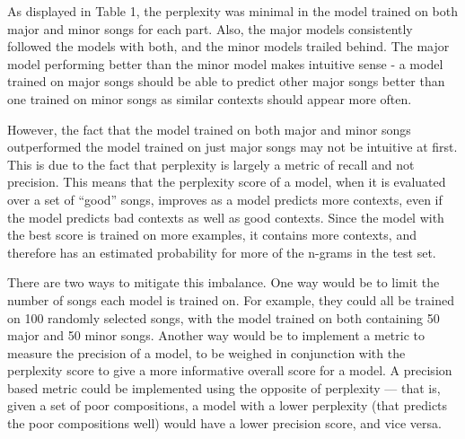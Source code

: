 \documentclass{sig-alternate}
\begin{document}
As displayed in Table 1, the perplexity was minimal in the model trained on both major and minor songs for each part. Also, the major models consistently followed the models with both, and the minor models trailed behind. The major model performing better than the minor model makes intuitive sense - a model trained on major songs should be able to predict other major songs better than one trained on minor songs as similar contexts should appear more often. 

However, the fact that the model trained on both major and minor songs outperformed the model trained on just major songs may not be intuitive at first. This is due to the fact that perplexity is largely a metric of recall and not precision. This means that the perplexity score of a model, when it is evaluated over a set of ``good'' songs, improves as a model predicts more contexts, even if the model predicts bad contexts as well as good contexts. Since the model with the best score is trained on more examples, it contains more contexts, and therefore has an estimated probability for more of the n-grams in the test set.

There are two ways to mitigate this imbalance. One way would be to limit the number of songs each model is trained on. For example, they could all be trained on 100 randomly selected songs, with the model trained on both containing 50 major and 50 minor songs. Another way would be to implement a metric to measure the precision of a model, to be weighed in conjunction with the perplexity score to give a more informative overall score for a model. A precision based metric could be implemented using the opposite of perplexity --- that is, given a set of poor compositions, a model with a lower perplexity (that predicts the poor compositions well) would have a lower precision score, and vice versa.
\end{document}
